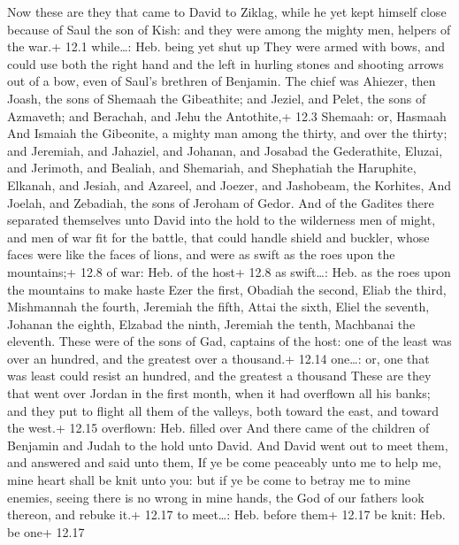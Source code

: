  Now these are they that came to David to Ziklag, while he
yet kept himself close because of Saul the son of Kish: and they were
among the mighty men, helpers of the war.+ 12.1 while\ldots: Heb. being
yet shut up  They were armed with bows, and could use both
the right hand and the left in hurling stones and shooting arrows out of
a bow, even of Saul's brethren of Benjamin.  The chief was
Ahiezer, then Joash, the sons of Shemaah the Gibeathite; and Jeziel, and
Pelet, the sons of Azmaveth; and Berachah, and Jehu the Antothite,+ 12.3
Shemaah: or, Hasmaah  And Ismaiah the Gibeonite, a mighty
man among the thirty, and over the thirty; and Jeremiah, and Jahaziel,
and Johanan, and Josabad the Gederathite,  Eluzai, and
Jerimoth, and Bealiah, and Shemariah, and Shephatiah the Haruphite,
 Elkanah, and Jesiah, and Azareel, and Joezer, and
Jashobeam, the Korhites,  And Joelah, and Zebadiah, the sons
of Jeroham of Gedor.  And of the Gadites there separated
themselves unto David into the hold to the wilderness men of might, and
men of war fit for the battle, that could handle shield and buckler,
whose faces were like the faces of lions, and were as swift as the roes
upon the mountains;+ 12.8 of war: Heb. of the host+ 12.8 as swift\ldots:
Heb. as the roes upon the mountains to make haste  Ezer the
first, Obadiah the second, Eliab the third,  Mishmannah the
fourth, Jeremiah the fifth,  Attai the sixth, Eliel the
seventh,  Johanan the eighth, Elzabad the ninth,
 Jeremiah the tenth, Machbanai the eleventh. 
These were of the sons of Gad, captains of the host: one of the least
was over an hundred, and the greatest over a thousand.+ 12.14 one\ldots:
or, one that was least could resist an hundred, and the greatest a
thousand  These are they that went over Jordan in the first
month, when it had overflown all his banks; and they put to flight all
them of the valleys, both toward the east, and toward the west.+ 12.15
overflown: Heb. filled over  And there came of the children
of Benjamin and Judah to the hold unto David.  And David
went out to meet them, and answered and said unto them, If ye be come
peaceably unto me to help me, mine heart shall be knit unto you: but if
ye be come to betray me to mine enemies, seeing there is no wrong in
mine hands, the God of our fathers look thereon, and rebuke it.+ 12.17
to meet\ldots: Heb. before them+ 12.17 be knit: Heb. be one+ 12.17
